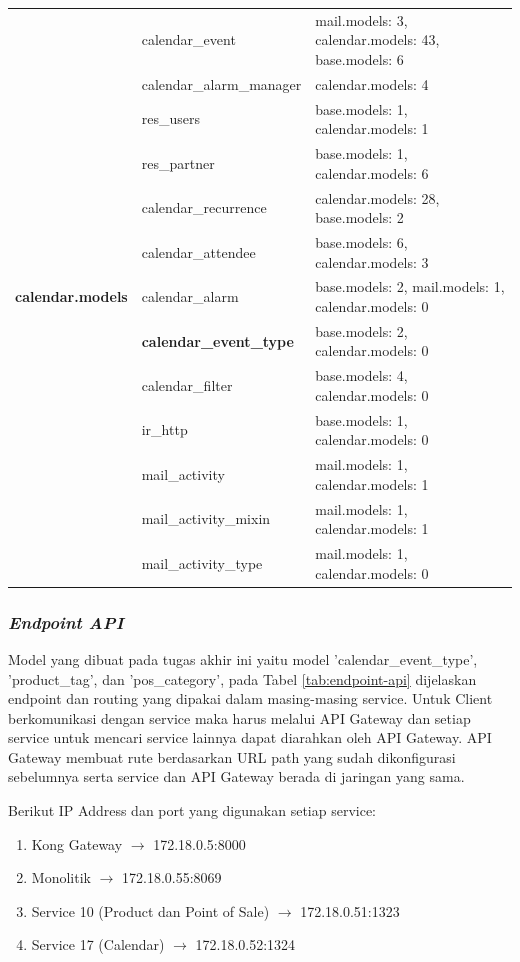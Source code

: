 \begin{longtable}{|c|p{4cm}|p{7cm}|}
	\hline
	\multirow{13}{*}{\textbf{calendar.models}} &  calendar{\_}event &  mail.models: 3, calendar.models: 43, base.models: 6 \\ \cline{2-3}  &  calendar{\_}alarm{\_}manager &  calendar.models: 4 \\ \cline{2-3}  &  res{\_}users &  base.models: 1, calendar.models: 1 \\ \cline{2-3}  &  res{\_}partner &  base.models: 1, calendar.models: 6 \\ \cline{2-3}  &  calendar{\_}recurrence &  calendar.models: 28, base.models: 2 \\ \cline{2-3}  &  calendar{\_}attendee &  base.models: 6, calendar.models: 3 \\ \cline{2-3}  &  calendar{\_}alarm &  base.models: 2, mail.models: 1, calendar.models: 0 \\ \cline{2-3}  &  \textbf{calendar{\_}event{\_}type} &  base.models: 2, calendar.models: 0 \\ \cline{2-3}  &  calendar{\_}filter &  base.models: 4, calendar.models: 0 \\ \cline{2-3}  &  ir{\_}http &  base.models: 1, calendar.models: 0 \\ \cline{2-3}  &  mail{\_}activity &  mail.models: 1, calendar.models: 1 \\ \cline{2-3}  &  mail{\_}activity{\_}mixin &  mail.models: 1, calendar.models: 1 \\ \cline{2-3}  &  mail{\_}activity{\_}type &  mail.models: 1, calendar.models: 0 \\
	\hline
\end{longtable}

\subsubsection{\textit{Endpoint API}}
Model yang dibuat pada tugas akhir ini yaitu model 'calendar\_event\_type', 'product\_tag', dan 'pos\_category', pada Tabel \ref{tab:endpoint-api} dijelaskan endpoint dan routing yang dipakai dalam masing-masing service.   Untuk Client berkomunikasi dengan service maka harus melalui API Gateway dan setiap service untuk mencari service lainnya dapat diarahkan oleh API Gateway. API Gateway membuat rute berdasarkan URL path yang sudah dikonfigurasi sebelumnya serta service dan API Gateway berada di jaringan yang sama.

Berikut IP Address dan port yang digunakan setiap service:
\begin{enumerate}[leftmargin=1.3cm]
	\item Kong Gateway $\rightarrow$ 172.18.0.5:8000
	\item Monolitik $\rightarrow$ 172.18.0.55:8069
	\item Service 10 (Product dan Point of Sale) $\rightarrow$ 172.18.0.51:1323
	\item Service 17 (Calendar) $\rightarrow$ 172.18.0.52:1324
\end{enumerate}

